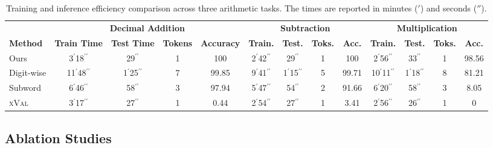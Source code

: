 \ifdefined\isarxiv
\begin{table*}[h!]
\centering
\small
\setlength{\tabcolsep}{2pt}  %
\caption{Training and inference efficiency comparison across three arithmetic tasks. The times are reported in minutes (\('\)) and seconds (\(''\)).}
\begin{tabular}{lcccc cccc cccc}
\toprule
 & \multicolumn{4}{c}{\textbf{Decimal Addition}} & \multicolumn{4}{c}{\textbf{Subtraction}} & \multicolumn{4}{c}{\textbf{Multiplication}} \\
\cmidrule(lr){2-5}\cmidrule(lr){6-9}\cmidrule(lr){10-13}
\textbf{Method} & \textbf{Train Time} & \textbf{Test Time} & \textbf{Tokens} & \textbf{Accuracy} & \textbf{Train.} & \textbf{Test.} & \textbf{Toks.} & \textbf{Acc.} & \textbf{Train.} & \textbf{Test.} & \textbf{Toks.} & \textbf{Acc.} \\
\midrule
Ours       & 3\(^{\prime}\)18\(^{\prime\prime}\) & 29\(^{\prime\prime}\) & 1 & 100 &
             2\(^{\prime}\)42\(^{\prime\prime}\) & 29\(^{\prime\prime}\) & 1 &  100 &
             2\(^{\prime}\)56\(^{\prime\prime}\) & 33\(^{\prime\prime}\) & 1 &  98.56   \\
Digit-wise & 11\(^{\prime}\)48\(^{\prime\prime}\) & 1\(^{\prime}\)25\(^{\prime\prime}\) & 7 & 99.85 &
             9\(^{\prime}\)41\(^{\prime\prime}\) & 1\(^{\prime}\)15\(^{\prime\prime}\) & 5 & 99.71 &
             10\(^{\prime}\)11\(^{\prime\prime}\) & 1\(^{\prime}\)18\(^{\prime\prime}\) & 8 &   81.21 \\
Subword    & 6\(^{\prime}\)46\(^{\prime\prime}\) & 58\(^{\prime\prime}\) & 3 & 97.94 &
             5\(^{\prime}\)47\(^{\prime\prime}\) & 54\(^{\prime\prime}\) & 2 & 91.66 &
             6\(^{\prime}\)20\(^{\prime\prime}\) & 58\(^{\prime\prime}\) & 3 & 8.05  \\
\textsc{xVal}       & 3\(^{\prime}\)17\(^{\prime\prime}\) & 27\(^{\prime\prime}\) & 1 & 0.44 &
             2\(^{\prime}\)54\(^{\prime\prime}\) & 27\(^{\prime\prime}\) & 1 & 3.41 &
             2\(^{\prime}\)56\(^{\prime\prime}\) & 26\(^{\prime\prime}\) & 1 & 0  \\
\bottomrule
\end{tabular}

\label{tab:time_comparison}
\end{table*}

\else
\fi
\subsection{Ablation Studies}\label{sec:ablation}

